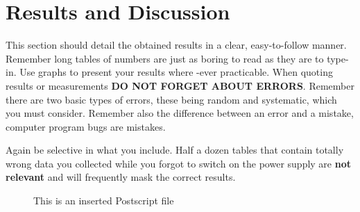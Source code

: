 \documentclass[a4paper,12pt]{article}
\begin{document}
%
%

\pagebreak
\section{Results and Discussion}

This section should detail the obtained results in a clear,
easy-to-follow manner. Remember long tables of numbers are just as boring to
read as they are to type-in. Use graphs to present your results where
-ever practicable. When quoting results or measurements
{\bf DO NOT FORGET ABOUT ERRORS}. Remember there are two basic types
of errors, these being random and systematic, which you must consider.
Remember also the difference between an error and a mistake, computer
program bugs are mistakes.

 
Again be selective in what you include. Half a dozen
tables that contain totally wrong data you collected while you forgot
to switch on the power supply are {\bf not relevant} and will frequently
mask the correct results. 
%
%
\begin{figure}[htb]     %
        \begin{center}
                \leavevmode             %
                \epsfxsize=90mm         %
\end{center}
\caption{This is an inserted Postscript file}
\end{figure}
\end{document}
